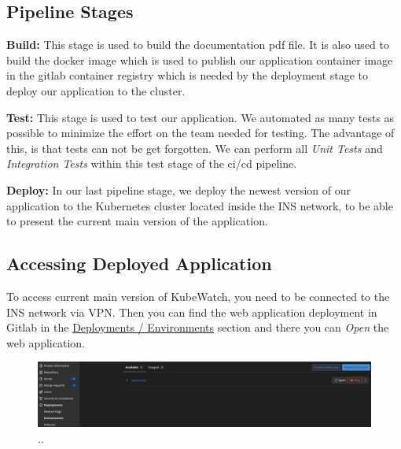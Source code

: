 \subsection{Pipeline Stages}
\textbf{Build:} This stage is used to build the documentation pdf file. It is also used to build the docker image which is used to publish our application container image in the gitlab container registry which is needed by the deployment stage to deploy our application to the cluster.


\textbf{Test:} This stage is used to test our application. We automated as many tests as possible to minimize the effort on the team needed for testing. The advantage of this, is that tests can not be get forgotten. We can perform all \textit{Unit Tests} and \textit{Integration Tests} within this test stage of the ci/cd pipeline.


\textbf{Deploy:} In our last pipeline stage, we deploy the newest version of our application to the Kubernetes cluster located inside the INS network, to be able to present the current main version of the application.

\subsection{Accessing Deployed Application}
To access current main version of KubeWatch, you need to be connected to the INS network via VPN. Then you can find the web application deployment in Gitlab in the \href{https://gitlab.ost.ch/SEProj/2022-FS/g03-kubewatch/kubewatch/-/environments}{Deployments / Environments} section and there you can \textit{Open} the web application.

\begin{figure}[H]
  \centering
  \includegraphics[width=\textwidth]{resources/web-application-INS.png}
..\label{fig:deployment-environment}
\end{figure}

